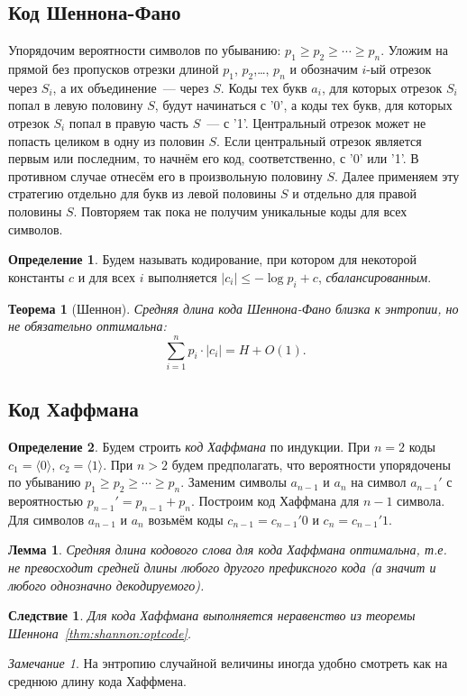 \documentclass[12pt]{article}
\theoremstyle{definition}
\newtheorem{definition}{Определение}[section]
\theoremstyle{plain}
\newtheorem{theorem}{Теорема}[section]
\newtheorem{lemma}{Лемма}[section]
\newtheorem{corollary}{Следствие}[section]
\theoremstyle{remark}
\newtheorem{remark}{Замечание}[section]
\begin{document}
\subsection{Код Шеннона-Фано}
Упорядочим вероятности символов по убыванию: $p_1\ge p_2\ge\dotsb\ge p_n$.
Уложим на прямой без пропусков отрезки длиной $p_1$, $p_2$,\ldots, $p_n$
и обозначим $i$-ый отрезок через $S_i$, а их объединение~--- через $S$.
Коды тех букв $a_i$, для которых отрезок $S_i$ попал в левую половину $S$,
будут начинаться с '0', а коды тех букв, для которых отрезок $S_i$ попал
в правую часть $S$~--- с '1'. Центральный отрезок может не попасть
целиком в одну из половин $S$. Если центральный отрезок является первым
или последним, то начнём его код, соответственно, с '0' или '1'.
В противном случае отнесём его в произвольную половину $S$. Далее
применяем эту стратегию отдельно для букв из левой половины $S$ и отдельно для
правой половины $S$. Повторяем так пока не получим уникальные коды для всех
символов.     

\begin{definition}
    Будем называть кодирование, при котором для некоторой константы $c$ и для
    всех $i$ выполняется $|c_i|\le - \log p_i + c$, \emph{сбалансированным}.
\end{definition}

\begin{theorem}[Шеннон]
    Средняя длина кода Шеннона-Фано близка к энтропии, но не обязательно
    оптимальна:
    \[
        \sum_{i=1}^n p_i\cdot |c_i| = H + O(1). 
    \]
\end{theorem}
\subsection{Код Хаффмана}
\begin{definition}
    Будем строить \emph{код Хаффмана} по индукции. При $n = 2$ коды $c_1 =
    \langle0\rangle$, $c_2 = \langle1\rangle$. При $n > 2$ будем предполагать,
    что вероятности упорядочены по убыванию $p_1\ge p_2\ge\dotsb\ge p_n$.
    Заменим символы $a_{n-1}$ и $a_n$ на символ $a_{n-1}'$ с вероятностью
    $p_{n-1}' = p_{n-1} + p_n$. Построим код Хаффмана для $n-1$ символа.
    Для символов $a_{n-1}$ и $a_n$ возьмём коды $c_{n-1} = c_{n-1}'0$ и
    $c_{n} = c_{n-1}'1$.
\end{definition}
\begin{lemma}
    Средняя длина кодового слова для кода Хаффмана оптимальна, т.е. не превосходит средней длины
    любого другого префиксного кода (а значит и любого однозначно
    декодируемого).    
\end{lemma}
\begin{corollary}
    Для кода Хаффмана выполняется неравенство из теоремы Шеннона~\ref{thm:shannon:optcode}.
\end{corollary}
\begin{remark}
    На энтропию случайной величины иногда удобно смотреть как на среднюю длину
    кода Хаффмена.
\end{remark}
\end{document}
